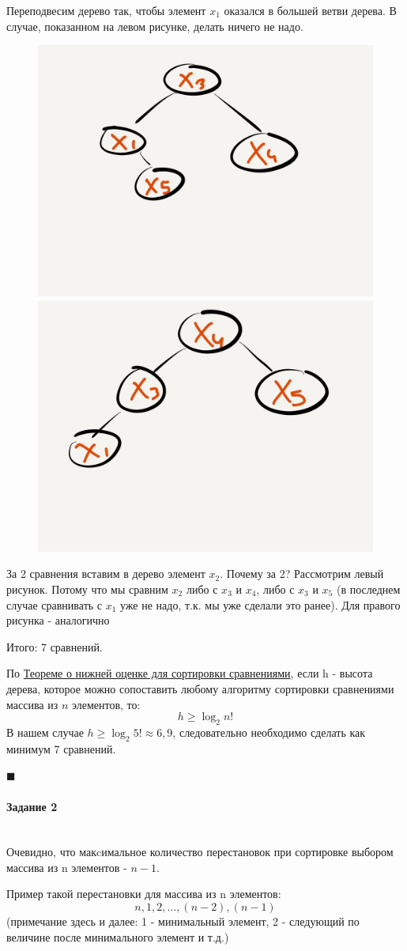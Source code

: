 \documentclass{article}
\newcommand{\myparagraph}[1]{\paragraph{#1}\mbox{}\\}
\begin{document}
  Переподвесим дерево так, чтобы элемент $x_{1}$ оказался в большей ветви дерева. В случае, показанном на левом рисунке, делать ничего не надо.

  \begin{figure}[h!]
  	\centering
  	\includegraphics[width = 0.4\linewidth]{Pictures/Picture3.jpg}
	\includegraphics[width = 0.4\linewidth]{Pictures/Picture4.jpg}
  \end{figure}

  За 2 сравнения вставим в дерево элемент $x_{2}$. Почему за 2? Рассмотрим левый рисунок. Потому что мы сравним $x_{2}$ либо с $x_{3}$ и $x_{4}$, либо с $x_{3}$ и $x_{5}$ (в последнем случае сравнивать с $x_{1}$ уже не надо, т.к. мы уже сделали это ранее). Для правого рисунка - аналогично

  Итого: 7 сравнений. 

  По \href{https://www.geeksforgeeks.org/lower-bound-on-comparison-based-sorting-algorithms/}{Теореме о нижней оценке для сортировки сравнениями}, если h - высота дерева, которое можно сопоставить любому алгоритму сортировки сравнениями массива из $n$ элементов, то: 
  $$ h \geq \log_2 n! $$
  В нашем случае $h \geq \log_2 5! \approx 6,9 $, следовательно необходимо сделать как минимум 7 сравнений.

  \begin{flushright}
    $\blacksquare$
  \end{flushright}

  \myparagraph{Задание 2}

  Очевидно, что макcимальное количество перестановок при сортировке выбором массива из n элементов - $n-1$.

  Пример такой перестановки для массива из n элементов:
  $$ n, 1, 2, ..., (n - 2), (n - 1) $$
  (примечание здесь и далее: 1 - минимальный элемент, 2 - следующий по величине после минимального элемент и т.д.)
\end{document}
